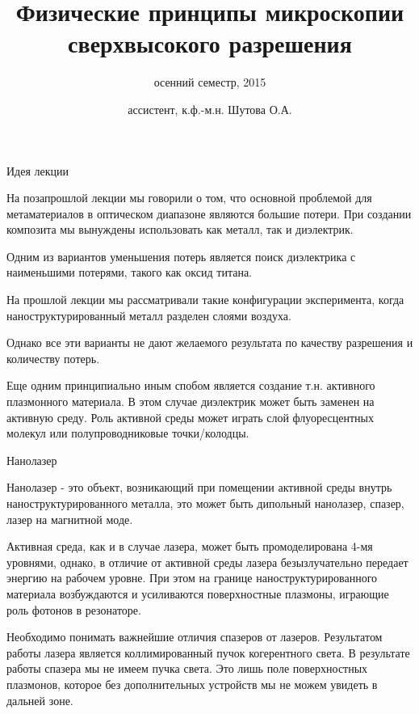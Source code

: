 \documentclass[9pt, compress, xcolor=table]{beamer}
\title{Физические принципы микроскопии сверхвысокого разрешения}
\subtitle{осенний семестр, 2015}
\author{ассистент, к.ф.-м.н. Шутова О.А.}
\institute{МГУ им. М.В. Ломоносова, физический факультет}
\begin{document}
\maketitle


\begin{frame}{Идея лекции}

На позапрошлой лекции мы говорили о том, что основной проблемой для метаматериалов в оптическом диапазоне являются большие потери. При создании композита мы вынуждены использовать как металл, так и диэлектрик. 

Одним из вариантов уменьшения потерь является поиск диэлектрика с наименьшими потерями, такого как оксид титана.

На прошлой лекции мы рассматривали такие конфигурации эксперимента, когда наноструктурированный металл разделен слоями воздуха.

Однако все эти варианты не дают желаемого результата по качеству разрешения и количеству потерь.

Еще одним принципиально иным спобом является создание т.н. активного плазмонного материала. В этом случае диэлектрик может быть заменен на активную среду. Роль активной среды может играть слой флуоресцентных молекул или полупроводниковые точки/колодцы.

\end{frame}

\begin{frame}{Нанолазер}

Нанолазер - это объект, возникающий при помещении активной среды внутрь наноструктурированного металла, это может быть дипольный нанолазер, спазер, лазер на магнитной моде.

Активная среда, как и в случае лазера, может быть промоделирована 4-мя уровнями, однако, в отличие от активной среды лазера безызлучательно передает энергию на рабочем уровне. При этом на границе наноструктурированного материала возбуждаются и усиливаются поверхностные плазмоны, играющие роль фотонов в резонаторе.

Необходимо понимать важнейшие отличия спазеров от лазеров. Результатом работы лазера является коллимированный пучок когерентного света. В результате работы спазера мы не имеем пучка света. Это лишь поле поверхностных плазмонов, которое без дополнительных устройств мы не можем увидеть в дальней зоне.


\end{frame}
\end{document}
